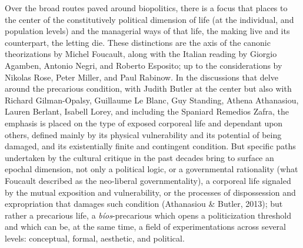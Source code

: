 \documentclass[a4paper,]{scrartcl}
\begin{document}
Over the broad routes paved around biopolitics, there is a focus that
places to the center of the constitutively political dimension of life
(at the individual, and population levels) and the managerial ways of
that life, the making live and its counterpart, the letting die. These
distinctions are the axis of the canonic theorizations by Michel
Foucault, along with the Italian reading by Giorgio Agamben, Antonio
Negri, and Roberto Esposito; up to the considerations by Nikolas Rose,
Peter Miller, and Paul Rabinow. In the discussions that delve around the
precarious condition, with Judith Butler at the center but also with
Richard Gilman-Opalsy, Guillaume Le Blanc, Guy Standing, Athena
Athanasiou, Lauren Berlant, Isabell Lorey, and including the Spaniard
Remedios Zafra, the emphasis is placed on the type of exposed corporeal
life and dependant upon others, defined mainly by its physical
vulnerability and its potential of being damaged, and its existentially
finite and contingent condition. But specific paths undertaken by the
cultural critique in the past decades bring to surface an epochal
dimension, not only a political logic, or a governmental rationality
(what Foucault described as the neo-liberal governmentality), a
corporeal life signaled by the mutual exposition and vulnerability, or
the processes of dispossession and expropriation that damages such
condition (Athanasiou \& Butler, 2013); but rather a precarious life, a
\emph{bíos}-precarious which opens a politicization threshold and which
can be, at the same time, a field of experimentations across several
levels: conceptual, formal, aesthetic, and political.
\end{document}
